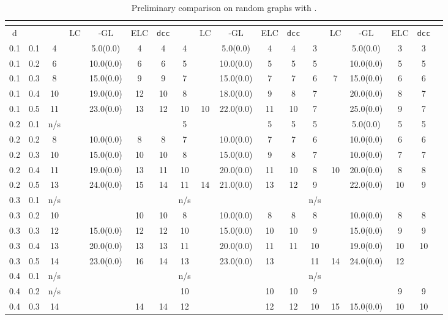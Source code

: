 \documentclass[10pt]{article}
\begin{document}
\begin{table}
  \small
  \centering
    \caption{Preliminary comparison on random graphs with .}
  \begin{tabular}{|c|c|c|c|c|c|c||c|c|c|c|c||c|c|c|c|c|c|} \hline
  	\multicolumn{17}{|c|}{} \\
  	\hline
	d&&& LC & -GL & ELC& \texttt{dcc} &  & LC & -GL & ELC & \texttt{dcc} & &LC&-GL&ELC&\texttt{dcc}\\ 
	\hline
	0.1&0.1&4&&5.0(0.0) & 4& 4 & 4& & 5.0(0.0) & 4 & 4 & 3 &&5.0(0.0)&3&3\\ 
	\hline
	0.1&0.2&6&  & 10.0(0.0) & 6& 6 & 5 &  & 10.0(0.0) & 5 & 5 & 5&&10.0(0.0)&5&5\\ 
	\hline
	0.1&0.3&8&  & 15.0(0.0) & 9& 9 & 7&  & 15.0(0.0) & 7 & 7 & 6&7&15.0(0.0)&6&6\\ 
	\hline
	0.1&0.4&10& & 19.0(0.0) & 12& 10 &8 &  & 18.0(0.0) & 9 & 8 & 7&&20.0(0.0)&8&7\\ 
	\hline
	0.1&0.5&11& & 23.0(0.0) & 13& 12 &10& 10 & 22.0(0.0) & 11 & 10 & 7&&25.0(0.0)&9&7\\ 
	\hline
	0.2&0.1&n/s&  & & & &5&  &  & 5 & 5 & 5&&5.0(0.0)&5&5\\ 
	\hline
	0.2&0.2&8&  & 10.0(0.0) & 8& 8 &7 &  & 10.0(0.0) & 7 & 7 & 6&&10.0(0.0)&6&6\\ 
	\hline
	0.2&0.3&10&  & 15.0(0.0) & 10& 10 &8 &  &15.0(0.0)& 9 & 8 & 7&&10.0(0.0)&7&7\\ 
	\hline
	0.2&0.4&11&  & 19.0(0.0) & 13& 11 & 10 &  & 20.0(0.0) & 11 & 10 & 8&10&20.0(0.0)&8&8\\ 
	\hline
	0.2&0.5&13&  & 24.0(0.0) & 15& 14 & 11& 14 & 21.0(0.0) & 13 & 12 & 9&&22.0(0.0)&10&9\\ 
	\hline
	0.3&0.1&n/s&  & & &  & n/s&  &  &  &  & n/s &&& & \\ 
	\hline
	0.3&0.2&10&  & & 10& 10 & 8 &  & 10.0(0.0)& 8 & 8 & 8&&10.0(0.0)&8&8\\ 
	\hline
	0.3&0.3&12&  & 15.0(0.0) & 12& 12 & 10 &  & 15.0(0.0) & 10 & 10 & 9&&15.0(0.0)&9&9\\ 
	\hline
	0.3&0.4&13&  & 20.0(0.0) & 13& 13 & 11&  & 20.0(0.0) & 11 & 11 & 10&&19.0(0.0)&10&10\\ 
	\hline
	0.3&0.5&14&  & 23.0(0.0) & 16& 14 & 13&  & 23.0(0.0) & 13 &  & 11&14&24.0(0.0)&12&\\ 
	\hline
	0.4&0.1&n/s&  &  & &  & n/s&  &  &  &  & n/s&&&&\\ 
	\hline
	0.4&0.2&n/s&  &  & &  & 10 &  && 10 & 10 & 9&&&9&9\\ 
	\hline
	0.4&0.3&14&  &  & 14& 14 & 12 &  &  & 12 & 12 & 10&15&15.0(0.0)&10&10\\ 

\end{tabular}
\end{table}
\end{document}
